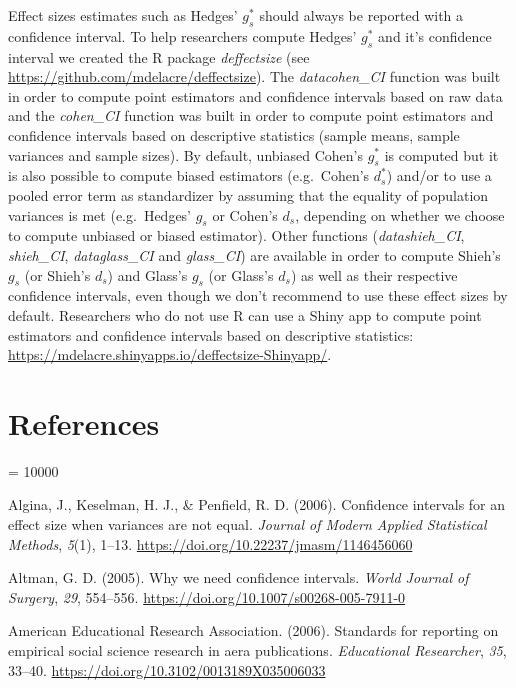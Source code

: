 \documentclass[
  english,
  man,floatsintext]{apa6}
\begin{document}
Effect sizes estimates such as Hedges' \(g^*_s\) should always be reported with a confidence interval. To help researchers compute Hedges' \(g^*_s\) and it's confidence interval we created the R package \emph{deffectsize} (see \url{https://github.com/mdelacre/deffectsize}). The \emph{datacohen\_CI} function was built in order to compute point estimators and confidence intervals based on raw data and the \emph{cohen\_CI} function was built in order to compute point estimators and confidence intervals based on descriptive statistics (sample means, sample variances and sample sizes). By default, unbiased Cohen's \(g^*_s\) is computed but it is also possible to compute biased estimators (e.g.~Cohen's \(d^*_s\)) and/or to use a pooled error term as standardizer by assuming that the equality of population variances is met (e.g.~Hedges' \(g_s\) or Cohen's \(d_s\), depending on whether we choose to compute unbiased or biased estimator). Other functions (\emph{datashieh\_CI}, \emph{shieh\_CI}, \emph{dataglass\_CI} and \emph{glass\_CI}) are available in order to compute Shieh's \(g_s\) (or Shieh's \(d_s\)) and Glass's \(g_s\) (or Glass's \(d_s\)) as well as their respective confidence intervals, even though we don't recommend to use these effect sizes by default. Researchers who do not use R can use a Shiny app to compute point estimators and confidence intervals based on descriptive statistics: \url{https://mdelacre.shinyapps.io/deffectsize-Shinyapp/}.

\hypertarget{references}{%
\section{References}\label{references}}

\begingroup

\interlinepenalty = 10000

\hypertarget{refs}{}
\leavevmode\hypertarget{ref-Algina_et_al_2006}{}%
Algina, J., Keselman, H. J., \& Penfield, R. D. (2006). Confidence intervals for an effect size when variances are not equal. \emph{Journal of Modern Applied Statistical Methods}, \emph{5}(1), 1--13. \url{https://doi.org/10.22237/jmasm/1146456060}

\leavevmode\hypertarget{ref-Altman_2005}{}%
Altman, G. D. (2005). Why we need confidence intervals. \emph{World Journal of Surgery}, \emph{29}, 554--556. \url{https://doi.org/10.1007/s00268-005-7911-0}

\leavevmode\hypertarget{ref-AERA_2006}{}%
American Educational Research Association. (2006). Standards for reporting on empirical social science research in aera publications. \emph{Educational Researcher}, \emph{35}, 33--40. \url{https://doi.org/10.3102/0013189X035006033}
\end{document}
